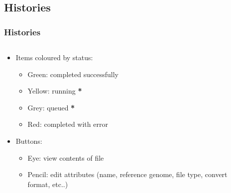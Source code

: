 \documentclass{beamer}              %
\begin{document}
\subsection{Histories}
\begin{frame}
\frametitle{Histories}
  \begin{columns}[T]
    \begin{column}{.82\textwidth}
	\begin{itemize}
	\item Items coloured by status:
		\begin{itemize}
		\item Green: completed successfully
		\item Yellow: running {\scriptsize \textbf{*}}
		\item Grey: queued {\scriptsize \textbf{*}}
		\item Red: completed with error
		\end{itemize}
	\item Buttons:
		\begin{itemize}
		\item Eye: view contents of file
		\item Pencil: edit attributes (name, reference genome, file type, convert format, etc..)
		\end{itemize}
	\end{itemize}
    \end{column}
    \begin{column}{.18\textwidth}

\end{column}
\end{columns}
\end{frame}
\end{document}
